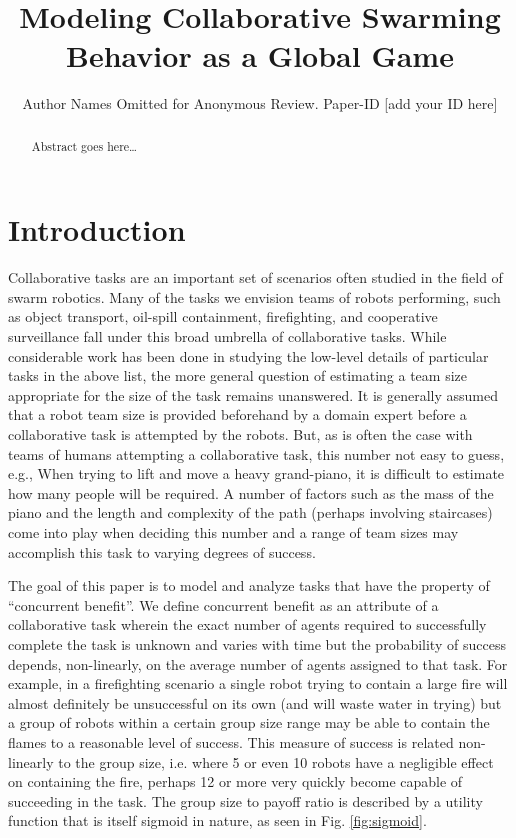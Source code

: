 \documentclass[conference]{IEEETran}
\begin{document}
\title{Modeling Collaborative Swarming Behavior as a Global Game}
\author{Author Names Omitted for Anonymous Review. Paper-ID [add your ID here]}

\maketitle

\begin{abstract}
Abstract goes here\ldots
\end{abstract}

\IEEEpeerreviewmaketitle

\section{Introduction}
Collaborative tasks are an important set of scenarios often studied in the field of swarm robotics. Many of the tasks we envision teams of robots performing, such as object transport, oil-spill containment, firefighting, and cooperative surveillance fall under this broad umbrella of collaborative tasks. While considerable work has been done in studying the low-level details of particular tasks in the above list, the more general question of estimating a team size appropriate for the size of the task remains unanswered. It is generally assumed that a robot team size is provided beforehand by a domain expert before a collaborative task is attempted by the robots. But, as is often the case with teams of humans attempting a collaborative task, this number not easy to guess, e.g., When trying to lift and move a heavy grand-piano, it is difficult to estimate how many people will be required. A number of factors such as the mass of the piano and the length and complexity of the path (perhaps involving staircases) come into play when deciding this number and a range of team sizes may accomplish this task to varying degrees of success.

The goal of this paper is to model and analyze tasks that have the property of ``concurrent benefit''. We define concurrent benefit as an attribute of a collaborative task wherein the exact number of agents required to successfully complete the task is unknown and varies with time but the probability of success depends, non-linearly, on the average number of agents assigned to that task. For example, in a firefighting scenario a single robot trying to contain a large fire will almost definitely be unsuccessful on its own (and will waste water in trying) but a group of robots within a certain group size range may be able to contain the flames to a reasonable level of success. This measure of success is related non-linearly to the group size, i.e. where 5 or even 10 robots have a negligible effect on containing the fire, perhaps 12 or more very quickly become capable of succeeding in the task. The group size to payoff ratio is described by a utility function that is itself sigmoid in nature, as seen in Fig. \ref{fig:sigmoid}.
\end{document}

